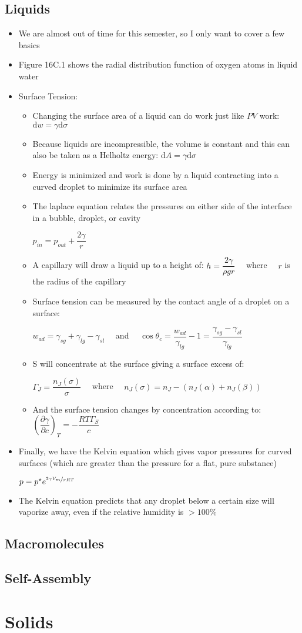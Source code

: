 \documentclass[12pt, openany, letterpaper]{memoir}
\begin{document}
\section{Liquids}
\begin{itemize}
	\item We are almost out of time for this semester, so I only want to cover a few basics
	\item Figure 16C.1 shows the radial distribution function of oxygen atoms in liquid water
	\item Surface Tension:
	\begin{itemize}
		\item Changing the surface area of a liquid can do work just like $PV$ work: $\mathrm{d}w = \gamma\mathrm{d}\sigma$
		\item Because liquids are incompressible, the volume is constant and this can also be taken as a Helholtz energy: $\mathrm{d}A = \gamma\mathrm{d}\sigma$
		\item Energy is minimized and work is done by a liquid contracting into a curved droplet to minimize its surface area
		\item The laplace equation relates the pressures on either side of the interface in a bubble, droplet, or cavity
		
		$p_{in}=p_{out}+\dfrac{2\gamma}{r}$
		\item A capillary will draw a liquid up to a height of: $h=\dfrac{2\gamma}{\rho gr}$ ~~where~~ $r$ is the radius of the capillary
		\item Surface tension can be measured by the contact angle of a droplet on a surface:
		
		$w_{ad}=\gamma_{sg}+\gamma_{lg}-\gamma_{sl}$ ~~and~~ $\cos\theta_c=\dfrac{w_{ad}}{\gamma_{lg}}-1=\dfrac{\gamma_{sg}-\gamma_{sl}}{\gamma_{lg}}$
		\item S will concentrate at the surface giving a surface excess of: 
		
		$\Gamma_J=\dfrac{n_J(\sigma)}{\sigma}$ ~~where~~ $n_J(\sigma) = n_J - \left(n_J(\alpha)+n_J(\beta)\right)$
		\item And the surface tension changes by concentration according to: $\left(\dfrac{\partial\gamma}{\partial c}\right)_T=-\dfrac{RT\Gamma_S}{c}$
	\end{itemize}
	\item Finally, we have the Kelvin equation which gives vapor pressures for curved surfaces (which are greater than the pressure for a flat, pure substance)
	
	$p=p^\star e^{\nicefrac{2\gamma V_m}{rRT}}$
	\item The Kelvin equation predicts that any droplet below a certain size will vaporize away, even if the relative humidity is $>100\%$
\end{itemize}

\section{Macromolecules}

\section{Self-Assembly}

\chapter{Solids}
\end{document}
